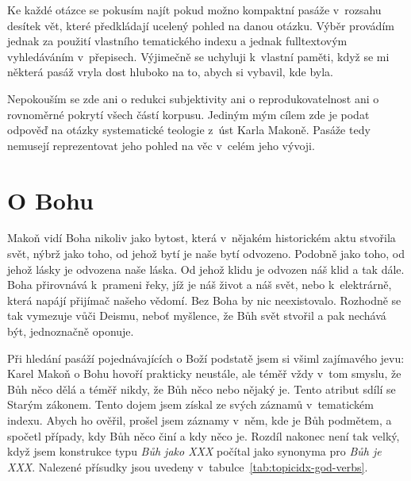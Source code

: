 Ke každé otázce se pokusím najít pokud možno kompaktní pasáže v~rozsahu desítek
vět, které předkládají ucelený pohled na danou otázku. Výběr provádím jednak za
použití vlastního tematického indexu a jednak fulltextovým vyhledáváním
v~přepisech. Výjimečně se uchyluji k~vlastní paměti, když se mi některá pasáž
vryla dost hluboko na to, abych si vybavil, kde byla.

Nepokouším se zde ani o redukci subjektivity ani o reprodukovatelnost ani o
rovnoměrné pokrytí všech částí korpusu. Jediným mým cílem zde je podat odpověď
na otázky systematické teologie z~úst Karla Makoně. Pasáže tedy nemusejí
reprezentovat jeho pohled na věc v~celém jeho vývoji.

\section{O Bohu}

Makoň vidí Boha nikoliv jako bytost, která v~nějakém historickém aktu stvořila
svět, nýbrž jako toho, od jehož bytí je naše bytí odvozeno. Podobně jako toho,
od jehož lásky je odvozena naše láska. Od jehož klidu je odvozen náš klid a tak
dále. Boha přirovnává k~prameni řeky, jíž je náš život a náš svět, nebo
k~elektrárně, která napájí přijímač našeho vědomí. Bez Boha by nic neexistovalo.
Rozhodně se tak vymezuje vůči Deismu, neboť myšlence, že Bůh svět stvořil a pak
nechává být, jednoznačně oponuje.

Při hledání pasáží pojednávajících o Boží podstatě jsem si všiml zajímavého
jevu: Karel Makoň o Bohu hovoří prakticky neustále, ale téměř vždy v~tom smyslu,
že Bůh něco dělá a téměř nikdy, že Bůh něco nebo nějaký je. Tento atribut sdílí
se Starým zákonem\cite{brueggemann2010old}. Tento dojem jsem získal ze svých
záznamů v~tematickém indexu. Abych ho ověřil, prošel jsem záznamy v~něm, kde je
Bůh podmětem, a spočetl případy, kdy Bůh něco činí a kdy něco je. Rozdíl nakonec
není tak velký, když jsem konstrukce typu \textit{Bůh jako XXX} počítal jako
synonyma pro \textit{Bůh je XXX}. Nalezené přísudky jsou uvedeny
v~tabulce~\ref{tab:topicidx-god-verbs}.

